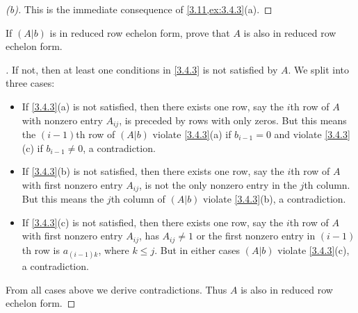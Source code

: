 \begin{proof}[(b)]
	This is the immediate consequence of \cref{3.11,ex:3.4.3}(a).
\end{proof}

\setcounter{ex}{13}
\begin{ex}\label{ex:3.4.14}
	If \((A | b)\) is in reduced row echelon form, prove that \(A\) is also in reduced row echelon form.
\end{ex}

\begin{proof}[]
	If not, then at least one conditions in \cref{3.4.3} is not satisfied by \(A\).
	We split into three cases:
	\begin{itemize}
		\item If \cref{3.4.3}(a) is not satisfied, then there exists one row, say the \(i\)th row of \(A\) with nonzero entry \(A_{i j}\), is preceded by rows with only zeros.
		      But this means the \((i - 1)\)th row of \((A | b)\) violate \cref{3.4.3}(a) if \(b_{i - 1} = 0\) and violate \cref{3.4.3}(c) if \(b_{i - 1} \neq 0\), a contradiction.
		\item If \cref{3.4.3}(b) is not satisfied, then there exists one row, say the \(i\)th row of \(A\) with first nonzero entry \(A_{i j}\), is not the only nonzero entry in the \(j\)th column.
		      But this means the \(j\)th column of \((A | b)\) violate \cref{3.4.3}(b), a contradiction.
		\item If \cref{3.4.3}(c) is not satisfied, then there exists one row, say the \(i\)th row of \(A\) with first nonzero entry \(A_{i j}\), has \(A_{i j} \neq 1\) or the first nonzero entry in \((i - 1)\)th row is \(a_{(i - 1) k}\), where \(k \leq j\).
		      But in either cases \((A | b)\) violate \cref{3.4.3}(c), a contradiction.
	\end{itemize}
	From all cases above we derive contradictions.
	Thus \(A\) is also in reduced row echelon form.
\end{proof}
